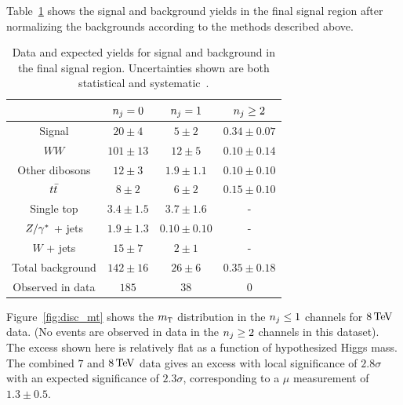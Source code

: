 Table~\ref{tab:disc_ww_results} shows the signal and background yields in the final signal region after normalizing the backgrounds according to the methods described above. 

\begin{table}[h!]
\centering
\captionsetup{justification=centering}

\hspace{-10pt}
\begin{tabular}{|c|c|c|c|}
\hline
& $n_j = 0$ & $n_j = 1$ & $n_j \geq 2$\\ \hline
Signal & $20 \pm 4$ & $5 \pm 2$ & $0.34 \pm 0.07$ \\ \hline
$WW$ & $101 \pm 13$ & $12 \pm 5$ & $0.10 \pm 0.14$ \\ 
Other dibosons & $12 \pm 3$ & $1.9 \pm 1.1$ & $0.10 \pm 0.10$ \\ 
$t\bar{t}$ & $8 \pm 2$ & $6 \pm 2$ & $0.15 \pm 0.10$ \\ 
Single top & $3.4 \pm 1.5$ & $3.7 \pm 1.6$ & - \\ 
$Z/\gamma^{\ast}$ + jets & $1.9 \pm 1.3$ & $0.10 \pm 0.10$ & - \\ 
$W$ + jets & $15 \pm 7$ & $2 \pm 1$ & - \\ \hline
Total background & $142 \pm 16$ & $26 \pm 6$ & $0.35 \pm 0.18$ \\ \hline
Observed in data & $185$ & $38$ & $0$ \\ \hline
\end{tabular}

\caption{
Data and expected yields for signal and background in the final \HWWfull signal region. Uncertainties shown are both statistical and systematic~\cite{Discovery}.
}
\label{tab:disc_ww_results}
\end{table}

Figure~\ref{fig:disc_mt} shows the $m_{\textrm{\footnotesize\sc t}}$ distribution in the $n_j \leq 1$ channels for $8 \TeV$ data. (No events are observed in data in the $n_j \geq 2$ channels in this dataset). The excess shown here is relatively flat as a function of hypothesized Higgs mass. The combined $7$ and $8\TeV$ data gives an excess with local significance of $2.8\sigma$ with an expected significance of $2.3\sigma$, corresponding to a $\mu$ measurement of $1.3\pm 0.5$. 

